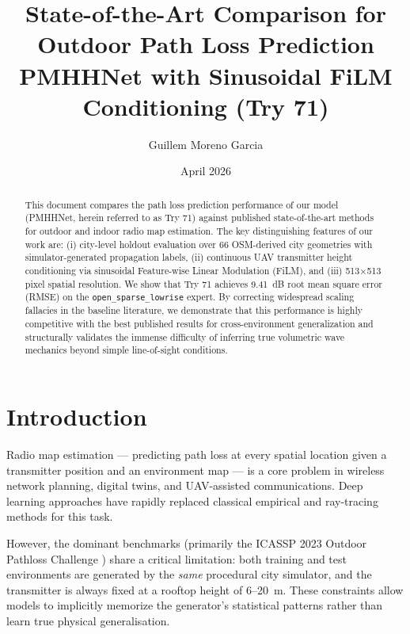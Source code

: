 \documentclass[11pt,a4paper]{article}
\title{%
    \textbf{State-of-the-Art Comparison for Outdoor Path Loss Prediction}\\[0.5em]
    \large PMHHNet with Sinusoidal FiLM Conditioning (Try 71)\\[0.3em]
}
\author{Guillem Moreno Garcia}
\date{April 2026}
\begin{document}
\maketitle
\thispagestyle{fancy}

\begin{abstract}
This document compares the path loss prediction performance of our model (PMHHNet,
herein referred to as Try 71) against published state-of-the-art methods for
outdoor and indoor radio map estimation. The key distinguishing features of our
work are: (i) city-level holdout evaluation over 66 OSM-derived city geometries
with simulator-generated propagation labels,
(ii) continuous UAV transmitter height conditioning via sinusoidal Feature-wise
Linear Modulation (FiLM), and (iii) 513$\times$513 pixel spatial resolution.
We show that Try 71 achieves 9.41~dB root mean square error (RMSE) on the
\texttt{open\_sparse\_lowrise} expert. By correcting widespread scaling fallacies in the baseline literature, we demonstrate that this performance is highly competitive with the best published results for cross-environment generalization and structurally validates the immense difficulty of inferring true volumetric wave mechanics beyond simple line-of-sight conditions.
\end{abstract}

\tableofcontents
\newpage

\section{Introduction}
\label{sec:intro}

Radio map estimation — predicting path loss at every spatial location given a
transmitter position and an environment map — is a core problem in wireless
network planning, digital twins, and UAV-assisted communications. Deep learning
approaches have rapidly replaced classical empirical and ray-tracing methods for
this task.

However, the dominant benchmarks (primarily the ICASSP 2023 Outdoor Pathloss
Challenge \cite{icassp2023challenge}) share a critical limitation: both training
and test environments are generated by the \emph{same} procedural city simulator,
and the transmitter is always fixed at a rooftop height of 6--20~m. These
constraints allow models to implicitly memorize the generator's statistical patterns
rather than learn true physical generalisation. 
\end{document}
